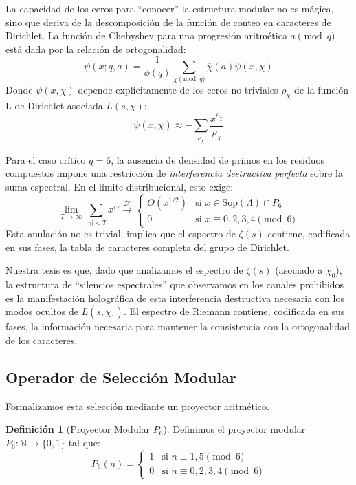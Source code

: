 \documentclass[12pt, a4paper]{article}
\theoremstyle{plain}
\theoremstyle{definition}
\newtheorem{definicion}[teorema]{Definición}
\newcommand{\N}{\mathbb{N}}
\begin{document}
La capacidad de los ceros para ``conocer'' la estructura modular no es mágica, sino que deriva de la descomposición de la función de conteo en caracteres de Dirichlet. La función de Chebyshev para una progresión aritmética $a \pmod q$ está dada por la relación de ortogonalidad:
\begin{equation}
    \psi(x; q, a) = \frac{1}{\phi(q)} \sum_{\chi \pmod q} \overline{\chi}(a) \psi(x, \chi)
\end{equation}
Donde $\psi(x, \chi)$ depende explícitamente de los ceros no triviales $\rho_\chi$ de la función L de Dirichlet asociada $L(s, \chi)$:
\begin{equation}
    \psi(x, \chi) \approx - \sum_{\rho_\chi} \frac{x^{\rho_\chi}}{\rho_\chi}
\end{equation}

Para el caso crítico $q=6$, la ausencia de densidad de primos en los residuos compuestos impone una restricción de \emph{interferencia destructiva perfecta} sobre la suma espectral. En el límite distribucional, esto exige:
\begin{equation}
    \lim_{T \to \infty} \sum_{|\gamma| < T} x^{i\gamma} \xrightarrow{\mathcal{D}'} 
    \begin{cases} 
      O(x^{1/2}) & \text{si } x \in \text{Sop}(\Lambda) \cap P_6 \\
      0 & \text{si } x \equiv 0,2,3,4 \pmod 6
    \end{cases}
\end{equation}
Esta anulación no es trivial; implica que el espectro de $\zeta(s)$ contiene, codificada en sus fases, la tabla de caracteres completa del grupo de Dirichlet.

Nuestra tesis es que, dado que analizamos el espectro de $\zeta(s)$ (asociado a $\chi_0$), la estructura de ``silencios espectrales'' que observamos en los canales prohibidos es la manifestación holográfica de esta interferencia destructiva necesaria con los modos ocultos de $L(s, \chi_1)$. El espectro de Riemann contiene, codificada en sus fases, la información necesaria para mantener la consistencia con la ortogonalidad de los caracteres.

\subsection{Operador de Selección Modular}

Formalizamos esta selección mediante un proyector aritmético.

\begin{definicion}[Proyector Modular $P_6$]
Definimos el proyector modular $P_6: \N \to \{0,1\}$ tal que:
\begin{equation}
    P_6(n) = \begin{cases}
    1 & \text{si } n \equiv 1, 5 \pmod{6} \\
    0 & \text{si } n \equiv 0, 2, 3, 4 \pmod{6}
    \end{cases}
\end{equation}
\end{definicion}
\end{document}

